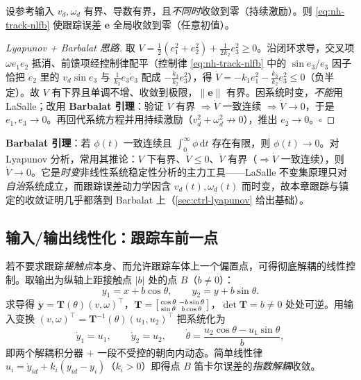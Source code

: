 \begin{theorem}\label{thm:nh-track-nl}
设参考输入 $v_d,\omega_d$ 有界、导数有界，且\emph{不同时}收敛到零（持续激励）。则 \cref{eq:nh-track-nlfb} 使跟踪误差 $\mathbf{e}$ 全局收敛到零（任意初值）。
\end{theorem}

\begin{proof}[Lyapunov + Barbalat 思路]
取 $V=\tfrac12(e_1^2+e_2^2)+\tfrac{1}{2k_2}e_3^2\ge0$。沿闭环求导，交叉项 $\omega e_1 e_2$ 抵消、前馈项经控制律配平（控制律 \cref{eq:nh-track-nlfb} 中的 $\sin e_3/e_3$ 因子恰把 $\dot e_2$ 里的 $v_d\sin e_3$ 与 $\tfrac1{k_2}e_3\dot e_3$ 配成 $-\tfrac{k_3}{k_2}e_3^2$），得 $\dot V=-k_1 e_1^2-\tfrac{k_3}{k_2}e_3^2\le0$（负半定）。故 $V$ 有下界且单调不增、收敛到极限，$\lVert\mathbf{e}\rVert$ 有界。因系统时变，\emph{不能}用 LaSalle；改用 \textbf{Barbalat 引理}：验证 $\ddot V$ 有界 $\Rightarrow\dot V$ 一致连续 $\Rightarrow\dot V\to0$，于是 $e_1,e_3\to0$。再回代系统方程并用持续激励（$v_d^2+\omega_d^2\not\to0$），推出 $e_2\to0$。$\square$
\end{proof}

\begin{note}\label{note:nh-barbalat}
\textbf{Barbalat 引理}：若 $\phi(t)$ 一致连续且 $\int_0^\infty\phi\,\mathrm{d}t$ 存在有限，则 $\phi(t)\to0$。对 Lyapunov 分析，常用其推论：$V$ 下有界、$\dot V\le0$、$\ddot V$ 有界（$\Rightarrow\dot V$ 一致连续），则 $\dot V\to0$。它是\emph{时变}非线性系统稳定性分析的主力工具——LaSalle 不变集原理只对\emph{自治}系统成立，而跟踪误差动力学因含 $v_d(t),\omega_d(t)$ 而时变，故本章跟踪与镇定的收敛证明几乎都落到 Barbalat 上（\cref{sec:ctrl-lyapunov} 给出基础）。
\end{note}

\subsection{输入/输出线性化：跟踪车前一点}
\label{sec:nh-track-io}

若不要求跟踪\emph{接触点}本身、而允许跟踪车体上一个偏置点，可得彻底解耦的线性控制。取输出为纵轴上距接触点 $|b|$ 处的点 $B$（$b\neq0$）：
\begin{equation}
  y_1=x+b\cos\theta,\qquad y_2=y+b\sin\theta .
  \label{eq:nh-io-out}
\end{equation}
求导得 $\dot{\mathbf{y}}=\mathbf{T}(\theta)(v,\omega)^\top$，$\mathbf{T}=\begin{bsmallmatrix}\cos\theta&-b\sin\theta\\\sin\theta&b\cos\theta\end{bsmallmatrix}$，$\det\mathbf{T}=b\neq0$ 处处可逆。用输入变换 $(v,\omega)^\top=\mathbf{T}^{-1}(\theta)(u_1,u_2)^\top$ 把系统化为
\begin{equation}
  \dot y_1=u_1,\qquad \dot y_2=u_2,\qquad \dot\theta=\frac{u_2\cos\theta-u_1\sin\theta}{b},
  \label{eq:nh-io-lin}
\end{equation}
即两个解耦积分器 $+$ 一段不受控的朝向内动态。简单线性律 $u_i=\dot y_{id}+k_i(y_{id}-y_i)$（$k_i>0$）即得点 $B$ 笛卡尔误差的\emph{指数解耦}收敛。

